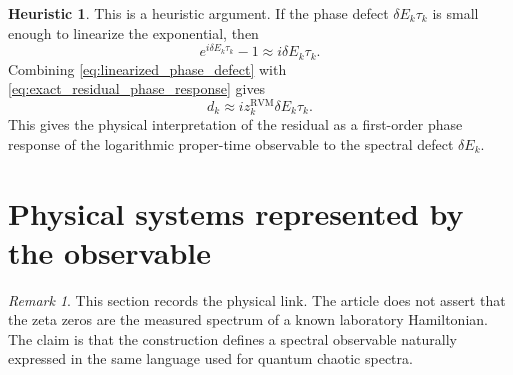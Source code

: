 \documentclass[11pt]{amsart}
\numberwithin{equation}{section}
\theoremstyle{plain}
\theoremstyle{definition}
\newtheorem{heuristic}[theorem]{Heuristic}
\theoremstyle{remark}
\newtheorem{remark}[theorem]{Remark}
\newcommand{\RVM}{\mathrm{RVM}}
\begin{document}
\begin{heuristic}
\label{heur:linear_response}
This is a heuristic argument.  If the phase defect \(\delta E_k\tau_k\) is small enough to linearize the exponential, then
\begin{equation}
e^{i\delta E_k\tau_k}-1
\approx
i\delta E_k\tau_k.
\label{eq:linearized_phase_defect}
\end{equation}
Combining \eqref{eq:linearized_phase_defect} with \eqref{eq:exact_residual_phase_response} gives
\begin{equation}
d_k
\approx
i z_k^{\RVM}\delta E_k\tau_k.
\label{eq:linear_residual_response}
\end{equation}
This gives the physical interpretation of the residual as a first-order phase response of the logarithmic proper-time observable to the spectral defect \(\delta E_k\).
\end{heuristic}

\section{Physical systems represented by the observable}
\label{sec:physical_systems}

\begin{remark}
\label{rem:why_physics_appears}
This section records the physical link.  The article does not assert that the zeta zeros are the measured spectrum of a known laboratory Hamiltonian.  The claim is that the construction defines a spectral observable naturally expressed in the same language used for quantum chaotic spectra.
\end{remark}
\end{document}
